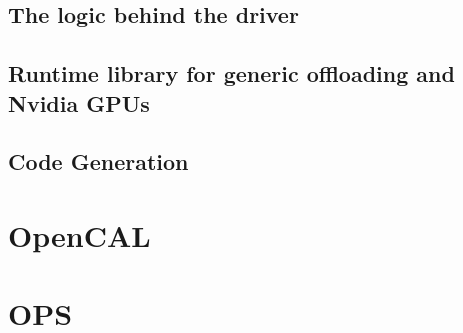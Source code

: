 \subsection{The logic behind the driver}

\subsection{Runtime library for generic offloading and Nvidia GPUs}

\subsection{Code Generation}


\section{OpenCAL}

\section{OPS}